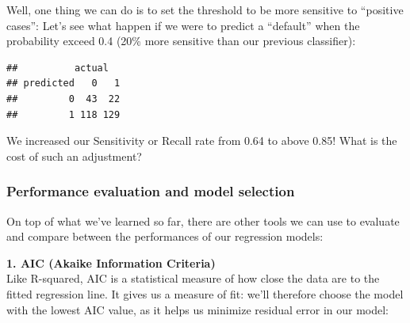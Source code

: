 \documentclass[
]{article}
\newenvironment{Shaded}{\begin{snugshade}}{\end{snugshade}}
\newcommand{\FloatTok}[1]{\textcolor[rgb]{0.00,0.00,0.81}{#1}}
\newcommand{\FunctionTok}[1]{\textcolor[rgb]{0.00,0.00,0.00}{#1}}
\newcommand{\NormalTok}[1]{#1}
\newcommand{\OtherTok}[1]{\textcolor[rgb]{0.56,0.35,0.01}{#1}}
\newcommand{\SpecialCharTok}[1]{\textcolor[rgb]{0.00,0.00,0.00}{#1}}
\newcommand{\StringTok}[1]{\textcolor[rgb]{0.31,0.60,0.02}{#1}}
\begin{document}
Well, one thing we can do is to set the threshold to be more sensitive
to ``positive cases'': Let's see what happen if we were to predict a
``default'' when the probability exceed 0.4 (20\% more sensitive than
our previous classifier):

\begin{Shaded}
\end{Shaded}

\begin{verbatim}
##          actual
## predicted   0   1
##         0  43  22
##         1 118 129
\end{verbatim}

We increased our Sensitivity or Recall rate from 0.64 to above 0.85!
What is the cost of such an adjustment?

\hypertarget{performance-evaluation-and-model-selection}{%
\subsubsection{Performance evaluation and model
selection}\label{performance-evaluation-and-model-selection}}

On top of what we've learned so far, there are other tools we can use to
evaluate and compare between the performances of our regression models:

\textbf{1. AIC (Akaike Information Criteria)}\\
Like R-squared, AIC is a statistical measure of how close the data are
to the fitted regression line. It gives us a measure of fit: we'll
therefore choose the model with the lowest AIC value, as it helps us
minimize residual error in our model:

\begin{Shaded}
\end{Shaded}
\end{document}

